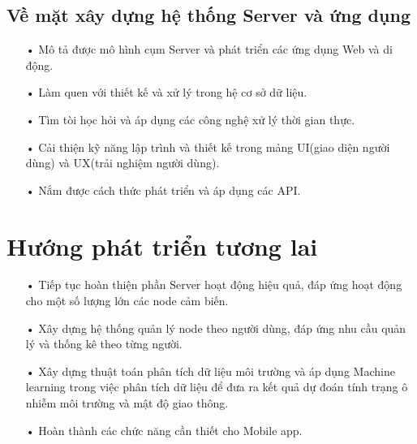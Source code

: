 \subsection{Về mặt xây dựng hệ thống Server và ứng dụng}
\begin{itemize}
	\item[•] Mô tả được mô hình cụm Server và phát triển các ứng dụng Web và di động.
	\item[•] Làm quen với thiết kế và xử lý trong hệ cơ sở dữ liệu.
	\item[•] Tìm tòi học hỏi và áp dụng các công nghệ xử lý thời gian thực.
	\item[•] Cải thiện kỹ năng lập trình và thiết kế trong mảng UI(giao diện người dùng) và UX(trải nghiệm người dùng).
	\item[•] Nắm được cách thức phát triển và áp dụng các API.
\end{itemize}
\section{Hướng phát triển tương lai}
\begin{itemize}
\item[•]Tiếp tục hoàn thiện phần Server hoạt động hiệu quả, đáp ứng hoạt động cho một số lượng lớn các node cảm biến.
\item[•]Xây dựng hệ thống quản lý node theo người dùng, đáp ứng nhu cầu quản lý và thống kê theo từng người.
\item[•]Xây dựng thuật toán phân tích dữ liệu môi trường và áp dụng Machine learning trong việc phân tích dữ liệu để đưa ra kết quả dự đoán tính trạng ô nhiễm môi trường và mật độ giao thông.
\item[•]Hoàn thành các chức năng cần thiết cho Mobile app.
\end{itemize}
